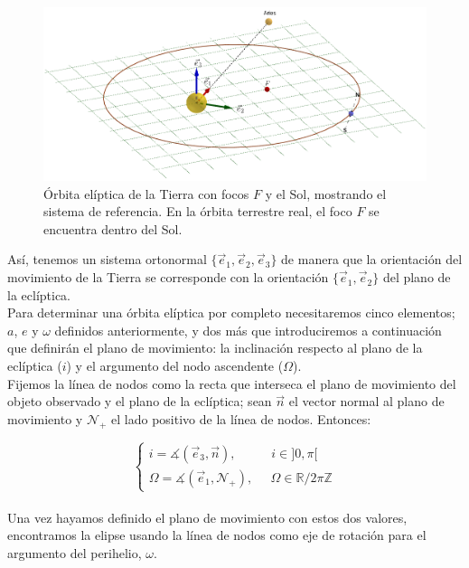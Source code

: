 \documentclass[11pt]{book}
\begin{document}
\begin{figure}[H]
\centering
\includegraphics[scale=0.35]{images/sistema_referencia_1.png}
\caption{Órbita elíptica de la Tierra con focos $F$ y el Sol, mostrando el sistema de referencia. En la órbita terrestre real, el foco $F$ se encuentra dentro del Sol.}
\label{fig:sistema_referencia}
\end{figure}

Así, tenemos un sistema ortonormal $\{\vec{e}_1,\vec{e}_2,\vec{e}_3\}$ de manera que la orientación del movimiento de la Tierra se corresponde con la orientación $\{\vec{e}_1,\vec{e}_2\}$ del plano de la eclíptica.\\

Para determinar una órbita elíptica por completo necesitaremos cinco elementos; $a$, $e$ y $\omega$ definidos anteriormente, y dos más que introduciremos a continuación que definirán el plano de movimiento: la inclinación respecto al plano de la eclíptica ($i$) y el argumento del nodo ascendente ($\Omega$).\\

Fijemos la línea de nodos como la recta que interseca el plano de movimiento del objeto observado y el plano de la eclíptica; sean $\vec{n}$ el vector normal al plano de movimiento y $\mathcal{N}_+$ el lado positivo de la línea de nodos. Entonces:

\[
\left\{
\begin{array}{l}
	i=\measuredangle(\vec{e}_3,\vec{n}), \; \; \; \; \; \; \; \; \; \; i\in]0,\pi[\\
	\Omega=\measuredangle(\vec{e}_1, \mathcal{N}_+), \; \; \; \; \; \Omega\in\mathbb{R}/2\pi\mathbb{Z}
\end{array}
\right.
\]\\

Una vez hayamos definido el plano de movimiento con estos dos valores, encontramos la elipse usando la línea de nodos como eje de rotación para el argumento del perihelio, $\omega$.
\end{document}
